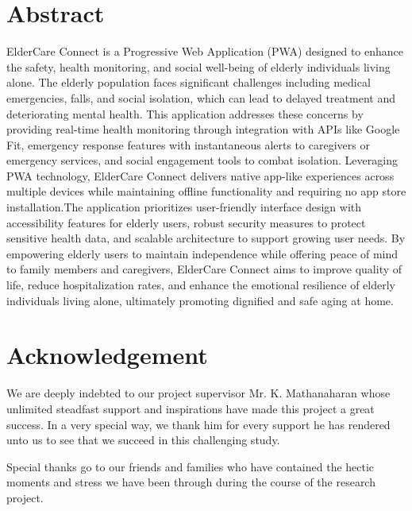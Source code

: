 \documentclass[12pt, a4paper]{report}
\begin{document}
\newpage
\cleardoublepage
{}
\chapter*{Abstract}
ElderCare Connect is a Progressive Web Application (PWA) designed to enhance the safety, health monitoring, and social well-being of elderly individuals living alone. The elderly population faces significant challenges including medical emergencies, falls, and social isolation, which can lead to delayed treatment and deteriorating mental health. This application addresses these concerns by providing real-time health monitoring through integration with APIs like Google Fit, emergency response features with instantaneous alerts to caregivers or emergency services, and social engagement tools to combat isolation. Leveraging PWA technology, ElderCare Connect delivers native app-like experiences across multiple devices while maintaining offline functionality and requiring no app store installation.The application prioritizes user-friendly interface design with accessibility features for elderly users, robust security measures to protect sensitive health data, and scalable architecture to support growing user needs. By empowering elderly users to maintain independence while offering peace of mind to family members and caregivers, ElderCare Connect aims to improve quality of life, reduce hospitalization rates, and enhance the emotional resilience of elderly individuals living alone, ultimately promoting dignified and safe aging at home.




\newpage
\cleardoublepage
{}
\chapter*{Acknowledgement}
We are deeply indebted to our project supervisor Mr. K. Mathanaharan whose unlimited steadfast support and inspirations have made this project a great success. In a very special way, we thank him for every support he has rendered unto us to see that we succeed in this challenging study.

Special thanks go to our friends and families who have contained the hectic moments and stress we have been through during the course of the research project.
\end{document}
